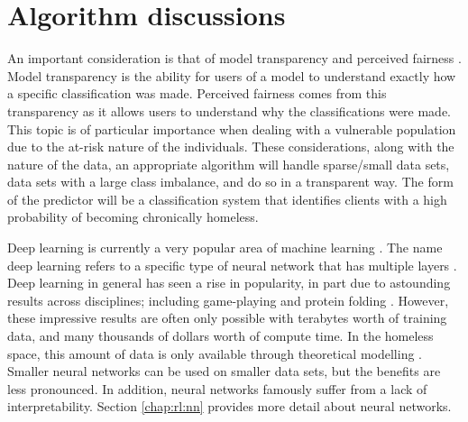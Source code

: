 \section{Algorithm discussions} \label{chap:intro:algos}
An important consideration is that of model transparency and perceived fairness \cite{karusala2019street}. Model transparency is the ability for users of a model to understand exactly how a specific classification was made. Perceived fairness comes from this transparency as it allows users to understand why the classifications were made. This topic is of particular importance when dealing with a vulnerable population \cite{eubanks2018automating} due to the at-risk nature of the individuals. These considerations, along with the nature of the data, an appropriate algorithm will handle sparse/small data sets, data sets with a large class imbalance, and do so in a transparent way. The form of the predictor will be a classification system that identifies clients with a high probability of becoming chronically homeless.

Deep learning is currently a very popular area of machine learning\cite{vanberlo2020interpretable} \cite{fisher2020simulating}. The name deep learning refers to a specific type of neural network that has multiple layers \cite{ibm2020dl}. Deep learning in general has seen a rise in popularity, in part due to astounding results across disciplines; including game-playing \cite{deepmind2020go} and protein folding \cite{deepmind2020alphafold2}. However, these impressive results are often only possible with terabytes worth of training data, and many thousands of dollars worth of compute time. In the homeless space, this amount of data is only available through theoretical modelling \cite{fisher2020simulating}. Smaller neural networks can be used on smaller data sets, but the benefits are less pronounced. In addition, neural networks famously suffer from a lack of interpretability. Section \ref{chap:rl:nn} provides more detail about neural networks.

